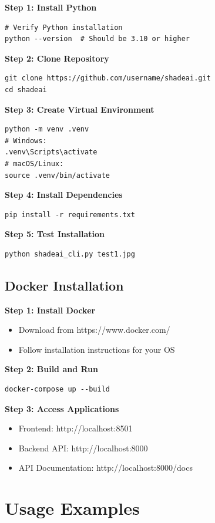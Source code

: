 \textbf{Step 1: Install Python}
\begin{verbatim}
# Verify Python installation
python --version  # Should be 3.10 or higher
\end{verbatim}

\textbf{Step 2: Clone Repository}
\begin{verbatim}
git clone https://github.com/username/shadeai.git
cd shadeai
\end{verbatim}

\textbf{Step 3: Create Virtual Environment}
\begin{verbatim}
python -m venv .venv
# Windows:
.venv\Scripts\activate
# macOS/Linux:
source .venv/bin/activate
\end{verbatim}

\textbf{Step 4: Install Dependencies}
\begin{verbatim}
pip install -r requirements.txt
\end{verbatim}

\textbf{Step 5: Test Installation}
\begin{verbatim}
python shadeai_cli.py test1.jpg
\end{verbatim}

\subsection{Docker Installation}

\textbf{Step 1: Install Docker}
\begin{itemize}
    \item Download from https://www.docker.com/
    \item Follow installation instructions for your OS
\end{itemize}

\textbf{Step 2: Build and Run}
\begin{verbatim}
docker-compose up --build
\end{verbatim}

\textbf{Step 3: Access Applications}
\begin{itemize}
    \item Frontend: http://localhost:8501
    \item Backend API: http://localhost:8000
    \item API Documentation: http://localhost:8000/docs
\end{itemize}

\section{Usage Examples}

